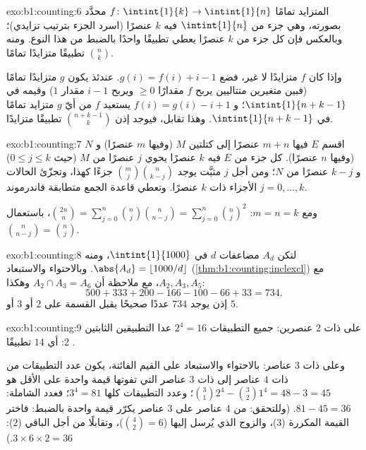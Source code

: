 \begin{solution}{exo:b1:counting:6}
 المتزايد تمامًا $f \colon \intint{1}{k} \to \intint{1}{n}$
محدَّد بصورته، وهي جزء من $\intint{1}{n}$ فيه $k$ عنصرًا (اسرد
الجزء بترتيب تزايدي)؛ وبالعكس فإن كل جزء من $k$ عنصرًا يعطي
تطبيقًا واحدًا بالضبط من هذا النوع. ومنه $\binom nk$ تطبيقًا متزايدًا تمامًا.

وإذا كان $f$ متزايدًا لا غير، فضع $g(i) = f(i) + i - 1$. عندئذ يكون $g$
متزايدًا تمامًا (فبين متغيرين متتاليين يربح $f$ مقدارًا $\geq 0$
ويربح $i - 1$ مقدار $1$) وقيمه في $\intint{1}{n + k - 1}$؛ و
$f(i) = g(i) - i + 1$ يستعيد $f$ من أيّ $g$ متزايد تمامًا
في $\intint{1}{n+k-1}$. وهذا تقابل، فيوجد إذن
$\binom{n + k - 1}{k}$ تطبيقًا متزايدًا.
\end{solution}

\begin{solution}{exo:b1:counting:7}
اقسم  $E$ فيها $m + n$ عنصرًا إلى كتلتين $M$ (وفيها $m$ عنصرًا)
و $N$ (وفيها $n$ عنصرًا). كل جزء من $E$ فيه $k$ عنصرًا يحوي $j$ عنصرًا
من $M$ (حيث $0 \leq j \leq k$) و $k - j$ عنصرًا من $N$؛ ومن أجل $j$ مثبَّت يوجد
$\binom mj \binom{n}{k-j}$ جزءًا كهذا، وتجزّئ الحالات $j = 0, \dots,
k$ الأجزاء ذات $k$ عنصرًا. وتعطي قاعدة الجمع متطابقة
فاندرموند.

ومع $m = n = k$: $\binom{2n}{n} = \sum_{j=0}^{n} \binom nj
\binom{n}{n-j} = \sum_{j=0}^{n} \binom nj^2$، باستعمال $\binom{n}{n-j} =
\binom nj$.
\end{solution}

\begin{solution}{exo:b1:counting:8}
لتكن $A_d$  مضاعفات $d$ في $\intint{1}{1000}$، ومنه
$\abs{A_d} = \lfloor 1000/d \rfloor$. وبالاحتواء والاستبعاد
(\cref{thm:b1:counting:inclexcl}) مع $A_2, A_3, A_5$، مع ملاحظة أن
$A_2 \cap A_3 = A_6$ وهكذا:
\[
500 + 333 + 200 - 166 - 100 - 66 + 33 = 734 .
\]
إذن يوجد $734$ عددًا صحيحًا يقبل القسمة على $2$ أو $3$ أو $5$.
\end{solution}

\begin{solution}{exo:b1:counting:9}
على  ذات $2$ عنصرين: جميع التطبيقات $2^4 = 16$ عدا التطبيقين
الثابتين $2$: أي $14$ تطبيقًا .

وعلى  ذات $3$ عناصر: بالاحتواء والاستبعاد على القيم الفائتة،
يكون عدد التطبيقات من  ذات $4$ عناصر إلى  ذات $3$ عناصر
التي تفوتها قيمة واحدة على الأقل هو $\binom 31 2^4 - \binom 32 1^4 = 48 - 3 = 45$؛ وعدد التطبيقات كلها $3^4 =
81$؛ فعدد الشاملة: $81 - 45 = 36$. (وللتحقق:  من $4$ عناصر
على $3$ عناصر يكرّر قيمة واحدة بالضبط: فاختر القيمة المكررة
($3$)، والزوج الذي يُرسل إليها ($\binom 42 = 6$)، وتقابلًا من أجل
الباقي ($2$): $3 \times 6 \times 2 = 36$.)
\end{solution}


